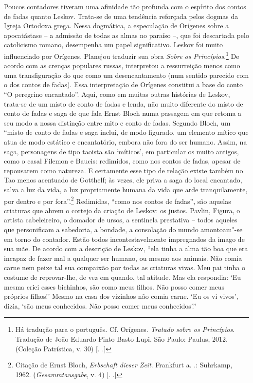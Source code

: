 Poucos contadores tiveram uma afinidade tão profunda com o espírito dos
contos de fadas quanto Leskov. Trata-se de uma tendência reforçada pelos
dogmas da Igreja Ortodoxa grega. Nessa dogmática, a especulação de
Orígenes sobre a apocatástase -- a admissão de todas as almas no paraíso
--, que foi descartada pelo catolicismo romano, desempenha um papel
significativo. Leskov foi muito influenciado por Orígenes. Planejou
traduzir sua obra \emph{Sobre os Princípios}.\footnote{Há tradução para
  o português. Cf. Orígenes. \emph{Tratado sobre os Princípios}.
  Tradução de João Eduardo Pinto Basto Lupi. São Paulo: Paulus, 2012.
  (Coleção Patrística, v. 30) [. .]} De acordo com as
crenças populares russas, interpretou a ressurreição menos como uma
transfiguração do que como um desencantamento (num sentido parecido com
o dos contos de fadas). Essa interpretação de Orígenes constitui a base
do conto ``O peregrino encantado''. Aqui, como em muitas outras
histórias de Leskov, trata-se de um misto de conto de fadas e lenda, não
muito diferente do misto de conto de fadas e saga de que fala Ernst
Bloch numa passagem em que retoma a seu modo a nossa distinção entre
mito e conto de fadas. Segundo Bloch, um ``misto de conto de fadas e
saga inclui, de modo figurado, um elemento mítico que atua de modo
estático e encantatório, embora não fora do ser humano. Assim, na saga,
personagens de tipo taoista são `míticos', em particular os muito
antigos, como o casal Filemon e Baucis: redimidos, como nos contos de
fadas, apesar de repousarem como natureza. E certamente esse tipo de
relação existe também no Tao menos acentuado de Gotthelf; às vezes, ele
priva a saga do local encantado, salva a luz da vida, a luz propriamente
humana da vida que arde tranquilamente, por dentro e por
fora''.\footnote{Citação de Ernst Bloch, \emph{Erbschaft dieser Zeit}.
  Frankfurt a. .: Suhrkamp, 1962. (\emph{Gesammtausgabe}, v. 4) [.
  .]} Redimidas, ``como nos contos de fadas'', são aquelas
criaturas que abrem o cortejo da criação de Leskov: os justos. Pavlin,
Figura, o artista cabeleireiro, o domador de ursos, a sentinela
prestativa -- todos aqueles que personificam a sabedoria, a bondade, a
consolação do mundo amontoam"-se em torno do contador. Estão todos
incontestavelmente impregnados da imago de sua mãe. De acordo com a
descrição de Leskov, ``ela tinha a alma tão boa que era incapaz de fazer
mal a qualquer ser humano, ou mesmo aos animais. Não comia carne nem
peixe tal sua compaixão por todas as criaturas vivas. Meu pai tinha o
costume de reprovar-lhe, de vez em quando, tal atitude. Mas ela
respondia: `Eu mesma criei esses bichinhos, são como meus filhos. Não
posso comer meus próprios filhos!' Mesmo na casa dos vizinhos não comia
carne. `Eu os vi vivos', dizia, `são meus conhecidos. Não posso comer
meus conhecidos'.''

